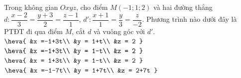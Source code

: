 \begin{ex}%
	Trong không gian $Oxyz$, cho điểm $M\left(-1;1;2\right)$ và hai đường thẳng $d\colon \dfrac{x-2}{3} = \dfrac{y+3}{2} = \dfrac{z-1}{1}$, $d'\colon \dfrac{x+1}{1} = \dfrac{y}{3} = \dfrac{z}{-2}$. Phương trình nào dưới đây là PTĐT đi qua điểm $M$, cắt $d$ và vuông góc với $d'$.
	\choice
	{$\heva{
	&x =-1+3t\\
	&y = 1+t\\
	&z = 2
	}$}
	{\True$\heva{
	&x =-1+3t\\
	&y = 1-t\\
	&z = 2
	}$}
	{$ \heva{
	&x = 1+3t\\
	&y = 1-t\\
	&z = 2
	}$}
	{$ \heva{
	&x =-1-7t\\
	&y = 1+7t\\
	&z = 2+7t
	}$}
\end{ex}
